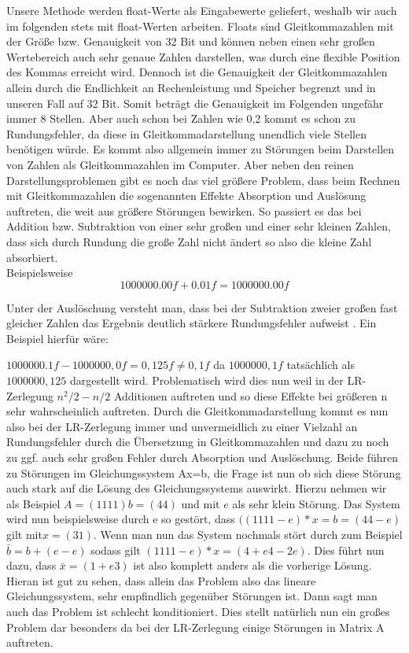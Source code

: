 \documentclass[course=erap]{aspdoc}
\begin{document}
Unsere Methode werden float-Werte als Eingabewerte geliefert, weshalb wir auch im
 folgenden stets mit float-Werten arbeiten. Floats sind Gleitkommazahlen mit der Größe 
bzw. Genauigkeit von 32 Bit und können neben einen sehr großen Wertebereich auch 
sehr genaue Zahlen darstellen, was durch eine flexible Position des Kommas erreicht 
wird. Dennoch ist die Genauigkeit der Gleitkommazahlen allein durch die Endlichkeit an 
Rechenleistung und Speicher begrenzt und in unseren Fall auf 32 Bit. Somit beträgt die 
Genauigkeit im Folgenden ungefähr immer 8 Stellen. Aber auch schon bei Zahlen wie 
0,2 kommt es schon zu Rundungsfehler, da diese in Gleitkommadarstellung unendlich 
viele Stellen benötigen würde. Es kommt also allgemein immer zu Störungen beim 
Darstellen von Zahlen als Gleitkommazahlen im Computer. Aber neben den reinen 
Darstellungsproblemen gibt es noch das viel größere Problem, dass beim Rechnen mit 
Gleitkommazahlen die sogenannten Effekte Absorption und Auslösung auftreten, die 
weit aus größere Störungen bewirken. So passiert es das bei Addition bzw. Subtraktion 
von einer sehr großen und einer sehr kleinen Zahlen, dass sich durch Rundung die 
große Zahl nicht ändert so also die kleine Zahl absorbiert.\\
Beispielsweise 
\begin{equation}
1000000.00f + 0.01f = 1000000.00f
\end{equation}


 Unter der Auslöschung versteht man, dass bei der 
Subtraktion zweier großen fast gleicher Zahlen das Ergebnis deutlich stärkere 
Rundungsfehler aufweist . Ein Beispiel hierfür wäre: 


$1000000.1f − 1000000,0f = 0,125f \neq 0,1f$ da $1000000,1f$ tatsächlich als $1000000,125$ 
dargestellt wird. Problematisch wird dies nun weil in der LR-Zerlegung $n^2 /2 - n/2 $
Additionen auftreten\cite{LUGenauigkeit} 
und so diese Effekte bei größeren n sehr wahrscheinlich auftreten. Durch die 
Gleitkommadarstellung kommt es nun also bei der LR-Zerlegung immer und 
unvermeidlich zu einer Vielzahl an Rundungsfehler durch die Übersetzung in 
Gleitkommazahlen und dazu zu noch zu ggf. auch sehr großen Fehler durch Absorption 
und Auslöschung.
Beide führen zu Störungen im Gleichungssystem Ax=b, die Frage ist nun ob sich diese 
Störung auch stark auf die Lösung des Gleichungssystems auswirkt. Hierzu nehmen wir 
als Beispiel $A = (1 1 1 1) b = (4 4) $ und mit $e$ als sehr klein Störung. Das System wird                    %
nun beispielsweise durch e so gestört, dass $((1 1 1 1-e)*x = b = (4 4-e)$ gilt mit$ x = (3 1)$. 
Wenn man nun das System nochmals stört durch zum Beispiel $\bar{b} = b + (e -e)$ sodass 
gilt $(1 1 1 1-e)*x = (4+e 4-2e)$. Dies führt nun dazu, dass $\bar{x} = ( 1+e 3)$ ist also komplett 
anders als die vorherige Lösung. Hieran ist gut zu sehen, dass allein das Problem also 
das lineare Gleichungssystem, sehr empfindlich gegenüber Störungen ist. Dann sagt 
man auch das Problem ist schlecht konditioniert. Dies stellt natürlich nun ein großes 
Problem dar besonders da bei der LR-Zerlegung einige Störungen in Matrix A auftreten.
\end{document}
